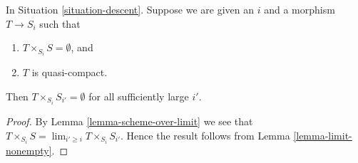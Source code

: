 \begin{lemma}
\label{lemma-limit-fibre-product-empty}
In Situation \ref{situation-descent}.
Suppose we are given an $i$ and a morphism $T \to S_i$ such that
\begin{enumerate}
\item $T \times_{S_i} S = \emptyset$, and
\item $T$ is quasi-compact.
\end{enumerate}
Then $T \times_{S_i} S_{i'} = \emptyset$ for all sufficiently large $i'$.
\end{lemma}

\begin{proof}
By Lemma \ref{lemma-scheme-over-limit}
we see that $T \times_{S_i} S = \lim_{i' \geq i} T \times_{S_i} S_{i'}$.
Hence the result follows from
Lemma \ref{lemma-limit-nonempty}.
\end{proof}
